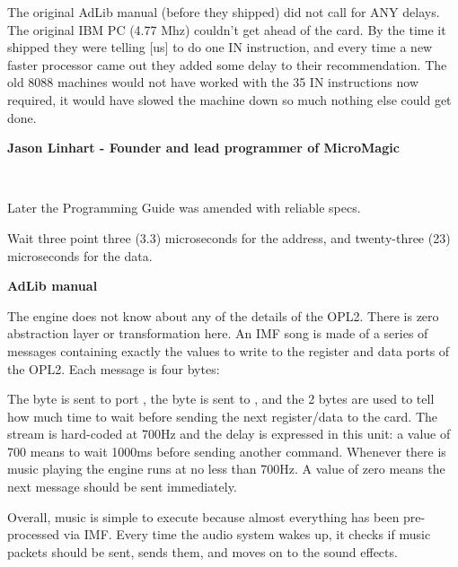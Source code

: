 \begin{fancyquotes}
The original AdLib manual (before they shipped) did not call for ANY delays. The original IBM PC (4.77 Mhz) couldn't get ahead of the card. By the time it shipped they were telling [us] to do one IN instruction, and every time a new faster processor came out they added some delay to their recommendation. The old 8088 machines would not have worked with the 35 IN instructions now required, it would have slowed the machine down so much nothing else could get done\footnotemark.\\
 \par
 \textbf{Jason Linhart - Founder and lead programmer of MicroMagic}
 \end{fancyquotes}
\\
\par
Later the Programming Guide was amended with reliable specs.\\
\par
\begin{fancyquotes}
Wait three point three (3.3) microseconds for the address, and twenty-three (23) microseconds for the data.\\
\par
\textbf{AdLib manual}
 \end{fancyquotes}
 

\par
The engine does not know about any of the details of the OPL2. There is zero abstraction layer or transformation here. An IMF song is made of a series of messages containing exactly the values to write to the register and data ports of the OPL2. Each message is four bytes:\\
\par
\begin{minipage}{\textwidth}

\end{minipage}
\par
The  byte is sent to port , the  byte is sent to , and the  2 bytes are used to tell how much time to wait before sending the next register/data to the card. The stream is hard-coded at 700Hz and the delay is expressed in this unit: a value of 700 means to wait 1000ms before sending another command. Whenever there is music playing the engine runs at no less than 700Hz. A value of zero means the next message should be sent immediately.\\
\par
Overall, music is simple to execute because almost everything has been pre-processed via IMF. Every time the audio system wakes up, it checks if music packets should be sent, sends them, and moves on to the sound effects.











